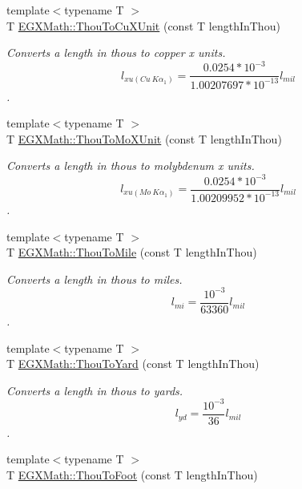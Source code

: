 \begin{DoxyCompactItemize}
{\footnotesize template$<$typename T $>$ }\\T \mbox{\hyperlink{group___e_g_x_math-_conversions-_length_conversions-_imperial-_thou-_non-_s_i_ga5614deb555c0360dfdaa94d01ad35b17}{E\+G\+X\+Math\+::\+Thou\+To\+Cu\+X\+Unit}} (const T length\+In\+Thou)
\begin{DoxyCompactList}\small\item\em Converts a length in thous to copper x units. \[ l_{xu(Cu\ K\alpha_1)}=\frac{0.0254 * 10^{-3}}{1.00207697*10^{-13}} l_{mil}\]. \end{DoxyCompactList}\item 
{\footnotesize template$<$typename T $>$ }\\T \mbox{\hyperlink{group___e_g_x_math-_conversions-_length_conversions-_imperial-_thou-_non-_s_i_ga3eb765800fa51e529878bdae4e997763}{E\+G\+X\+Math\+::\+Thou\+To\+Mo\+X\+Unit}} (const T length\+In\+Thou)
\begin{DoxyCompactList}\small\item\em Converts a length in thous to molybdenum x units. \[ l_{xu(Mo\ K\alpha_1)}=\frac{0.0254 * 10^{-3}}{1.00209952*10^{-13}} l_{mil}\]. \end{DoxyCompactList}\item 
{\footnotesize template$<$typename T $>$ }\\T \mbox{\hyperlink{group___e_g_x_math-_conversions-_length_conversions-_imperial-_thou-_imperial_ga1a3d3b11a614cf1e7086506cc0dc1430}{E\+G\+X\+Math\+::\+Thou\+To\+Mile}} (const T length\+In\+Thou)
\begin{DoxyCompactList}\small\item\em Converts a length in thous to miles. \[ l_{mi}=\frac{10^{-3}}{63360} l_{mil} \]. \end{DoxyCompactList}\item 
{\footnotesize template$<$typename T $>$ }\\T \mbox{\hyperlink{group___e_g_x_math-_conversions-_length_conversions-_imperial-_thou-_imperial_ga15eba45029ba30529fbd0038af9de3a2}{E\+G\+X\+Math\+::\+Thou\+To\+Yard}} (const T length\+In\+Thou)
\begin{DoxyCompactList}\small\item\em Converts a length in thous to yards. \[ l_{yd}= \frac{10^{-3}}{36} l_{mil} \]. \end{DoxyCompactList}\item 
{\footnotesize template$<$typename T $>$ }\\T \mbox{\hyperlink{group___e_g_x_math-_conversions-_length_conversions-_imperial-_thou-_imperial_ga10138630a7c3b1f80dfb4a34552e0af5}{E\+G\+X\+Math\+::\+Thou\+To\+Foot}} (const T length\+In\+Thou)

\end{DoxyCompactItemize}
